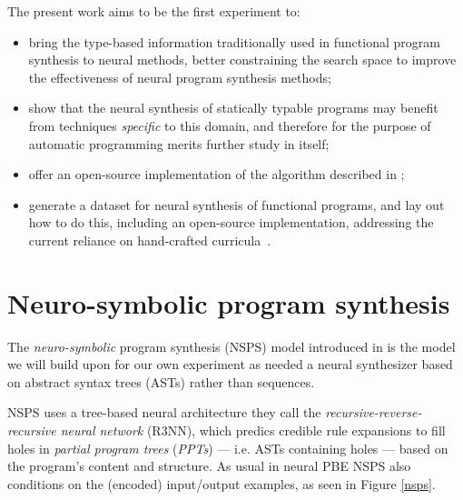\documentclass{article} %
\begin{document}
The present work aims to be the first experiment to:
\begin{itemize}
    \item bring the type-based information traditionally used in functional program synthesis to neural methods,
    better constraining the search space to improve the effectiveness of neural program synthesis methods;
    \item show that the neural synthesis of statically typable programs may benefit from techniques \emph{specific} to this domain, and therefore for the purpose of automatic programming merits further study in itself;
    \item offer an open-source implementation of the algorithm described in \citet{nsps};
    \item generate a dataset for neural synthesis of functional programs, and lay out how to do this, including an open-source implementation, addressing the current reliance on hand-crafted curricula~\citep{nps}.
\end{itemize}

\vspace{-10pt}
\section{Neuro-symbolic program synthesis} \label{sec:nsps}
\vspace{-10pt}

The \emph{neuro-symbolic} program synthesis (NSPS) model introduced in \citet{nsps}
is the model we will build upon for our own experiment as needed a neural synthesizer
based on abstract syntax trees (ASTs) rather than sequences.

NSPS uses a tree-based neural architecture they call the
\emph{recursive-reverse-recursive neural network} (R3NN),
which predics credible rule expansions to fill holes
in \emph{partial program trees} (\emph{PPTs}) --- i.e. ASTs containing holes --- based on the program's content and structure.
As usual in neural PBE NSPS also conditions on the (encoded) input/output examples, as seen in Figure \ref{nsps}.
\end{document}
